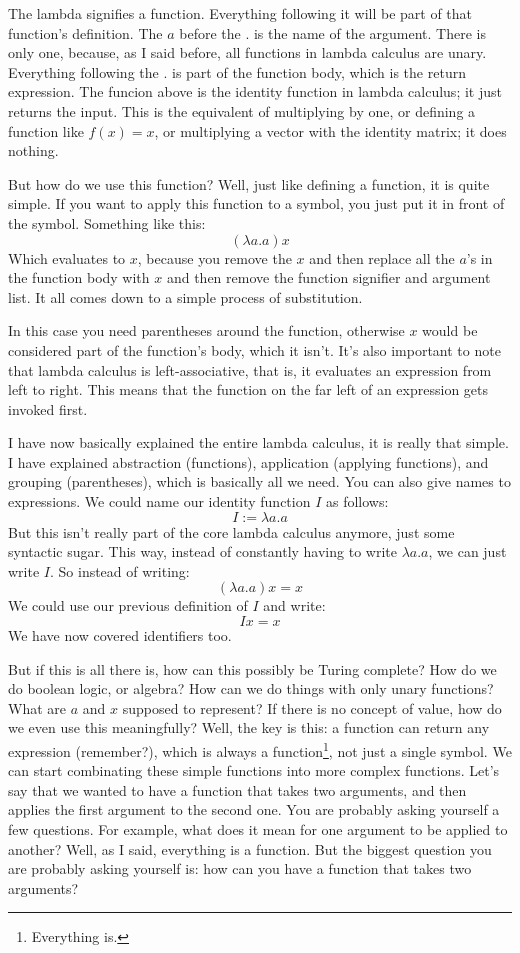 \documentclass[11pt]{article}
\begin{document}
The lambda signifies a function. Everything following it will be part of that
function's definition. The \(a\) before the \(.\) is the name of the argument.
There is only one, because, as I said before, all functions in lambda calculus
are unary. Everything following the \(.\) is part of the function body, which
is the return expression. The funcion above is the identity function in lambda
calculus; it just returns the input. This is the equivalent of multiplying by
one, or defining a function like \(f(x)=x\), or multiplying a vector with the
identity matrix; it does nothing.

But how do we use this function? Well, just like defining a function, it is
quite simple. If you want to apply this function to a symbol, you just put it
in front of the symbol. Something like this:
\[(\lambda a.a)x\]
Which evaluates to \(x\), because you remove the \(x\) and then replace all the
\(a\)'s in the function body with \(x\) and then remove the function signifier
and argument list. It all comes down to a simple process of substitution.

In this case you need parentheses around the function, otherwise \(x\) would be
considered part of the function's body, which it isn't. It's also important to
note that lambda calculus is left-associative, that is, it evaluates an
expression from left to right. This means that the function on the far left of
an expression gets invoked first.

I have now basically explained the entire lambda calculus, it is really that
simple. I have explained abstraction (functions), application (applying
functions), and grouping (parentheses), which is basically all we need. You
can also give names to expressions. We could name our identity function \(I\)
as follows: \[I:=\lambda a.a\] But this isn't really part of the core lambda
calculus anymore, just some syntactic sugar. This way, instead of constantly
having to write \(\lambda a.a\), we can just write \(I\). So instead of
writing: \[(\lambda a.a)x=x\] We could use our previous definition of \(I\) and
write: \[Ix=x\] We have now covered identifiers too.

But if this is all there is, how can this possibly be Turing complete? How do
we do boolean logic, or algebra? How can we do things with only unary
functions? What are \(a\) and \(x\) supposed to represent? If there is no
concept of value, how do we even use this meaningfully? Well, the key is this:
a function can return any expression (remember?), which is always a
function\footnote{Everything is.}, not just a single symbol. We can start
combinating these simple functions into more complex functions. Let's say that
we wanted to have a function that takes two arguments, and then applies the
first argument to the second one. You are probably asking yourself a few
questions. For example, what does it mean for one argument to be applied to
another? Well, as I said, everything is a function. But the biggest question
you are probably asking yourself is: how can you have a function that takes two
arguments?
\end{document}

